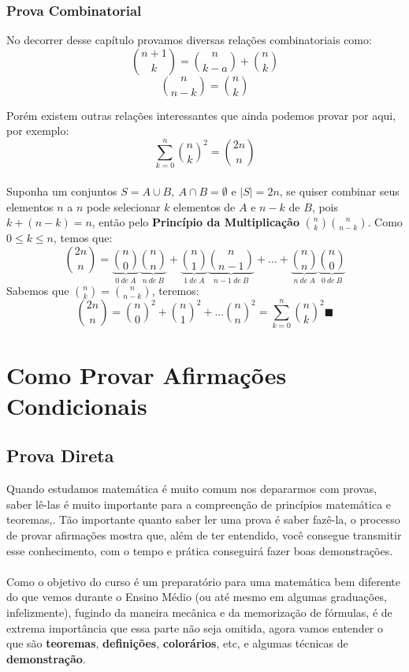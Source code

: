 \documentclass[a4paper,11pt,oneside]{book}
\theoremstyle{definition}
\theoremstyle{break}
\begin{document}
\section{Prova Combinatorial}
No decorrer desse capítulo provamos diversas relações combinatoriais como:
$$ {n+1 \choose k} = {n \choose k-a} + {n \choose k}$$
$${n \choose n-k} = {n \choose k}$$

Porém existem outras relações interessantes que ainda podemos provar por aqui, por exemplo:
$$\sum_{k = 0}^{n} {n \choose k}^2 = {2n \choose n}$$
\\
Suponha um conjuntos $S = A \cup B, \ A \cap B = \emptyset$ e $|S| = 2n$, se quiser combinar seus elementos $n$ a $n$ pode selecionar $k$ elementos de $A$ e $n-k$ de $B$, pois $k+(n-k) = n$, então pelo \textbf{Princípio da Multiplicação} ${n \choose k}{n \choose n-k}$. Como $0 \leq k \leq n$, temos que:
$${2n \choose n} = \underbrace{n \choose 0}_{0 \ de \ A}\underbrace{n \choose n}_{n \ de \ B} + \underbrace{n \choose 1}_{1 \ de \ A}\underbrace{n \choose n-1}_{n-1 \ de \ B} + \dots + \underbrace{n \choose n}_{n \ de \ A}\underbrace{n \choose 0}_{0 \ de \ B}$$
Sabemos que ${n \choose k} = {n \choose n-k}$, teremos:
$${2n \choose n} = {n \choose 0}^2 + {n \choose 1}^2 + \dots {n \choose n}^2 = \sum_{k = 0}^{n} {n \choose k}^2 \blacksquare$$
\part{Como Provar Afirmações Condicionais}

\chapter{Prova Direta}
Quando estudamos matemática é muito comum nos depararmos com provas, saber lê-las é muito importante para a compreenção de princípios matemática e teoremas,. Tão importante quanto saber ler uma prova é saber fazê-la, o processo de provar afirmações mostra que, além de ter entendido, você consegue transmitir esse conhecimento, com o tempo e prática conseguirá fazer boas demonstrações.
\\
\\
Como o objetivo do curso é um preparatório para uma matemática bem diferente do que vemos durante o Ensino Médio (ou até mesmo em algumas graduações, infelizmente), fugindo da maneira mecânica e da memorização de fórmulas, é de extrema importância que essa parte não seja omitida, agora vamos entender o que são \textbf{teoremas}, \textbf{definições}, \textbf{colorários}, etc, e algumas técnicas de \textbf{demonstração}.
\end{document}
